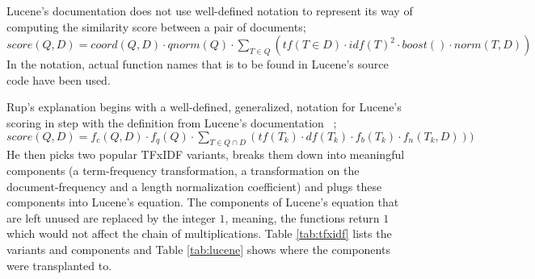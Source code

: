 Lucene's documentation does not use well-defined notation to represent
its way of computing the similarity score between a pair of
documents;
\\
$score(Q,D) = coord(Q,D) \cdot qnorm(Q) \cdot \displaystyle\sum_{T \in Q} (tf(T \in D) \cdot idf(T)^2 \cdot boost() \cdot norm(T, D))$
\\
In the notation, actual function names that is to be found in Lucene's
source code have been used.

Rup's explanation begins with a well-defined, generalized, notation
for Lucene's scoring in step with the definition from Lucene's
documentation ~\cite{Lucene:6.2.1:Scoring};
\\
$score(Q,D) = f_{c}(Q,D) \cdot f_{q}(Q) \cdot \displaystyle\sum_{T \in Q \cap D}(tf(T_{k}) \cdot df(T_{k}) \cdot f_{b}(T_{k}) \cdot f_{n}(T_{k},D)))$
\\
He then picks two popular TFxIDF variants, breaks them down into
meaningful components (a term-frequency transformation, a
transformation on the document-frequency and a length normalization
coefficient) and plugs these components into Lucene's equation. The
components of Lucene's equation that are left unused are replaced by
the integer $1$, meaning, the functions return $1$ which would not
affect the chain of multiplications. Table \ref{tab:tfxidf} lists the
variants and components and Table \ref{tab:lucene} shows where the
components were transplanted to.

